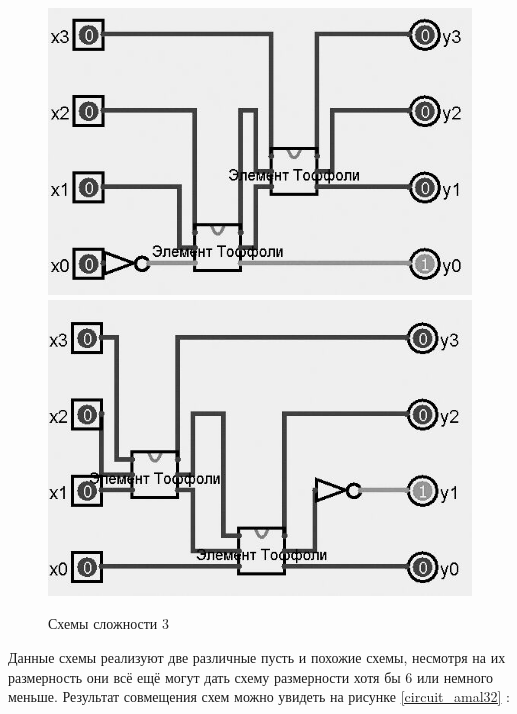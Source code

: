 \documentclass[14pt]{extarticle} %
\begin{document}
\begin{figure}[h]
	\centering
	\caption{Схемы сложности 3}
	\includegraphics[scale=0.4]{img/test 1.jpg}
	\includegraphics[scale=0.4]{img/test 2.jpg}
	
	\label{circuit_3}
\end{figure}

Данные схемы реализуют две различные пусть и похожие схемы, несмотря на их размерность они всё ещё могут дать схему размерности хотя бы 6 или немного меньше. Результат совмещения схем можно увидеть на рисунке   \ref{circuit_amal32} :
\end{document}
